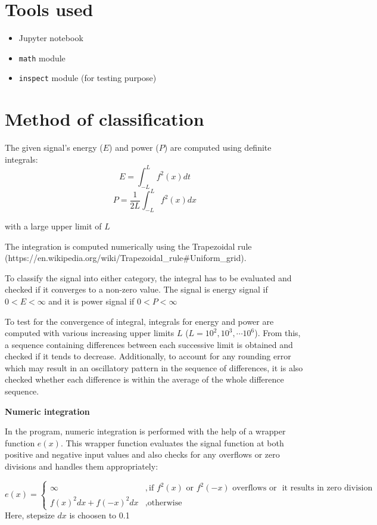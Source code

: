 \documentclass[11pt]{article}
\providecommand{\tightlist}{%
      \setlength{\itemsep}{0pt}\setlength{\parskip}{0pt}}
\begin{document}
\section*{Tools used}

\begin{itemize}
\tightlist
\item
  Jupyter notebook
\item
  \texttt{math} module
\item
  \texttt{inspect} module (for testing purpose)
\end{itemize}

\section*{Method of classification}

The given signal's energy (\(E\)) and power (\(P\)) are computed using
definite integrals: \[ E = \int_{-L} ^ L f^2(x) dt \]
\[P = \frac{1}{2L}\int_{-L} ^ L f^2(x) dx\]

with a large upper limit of \(L\)

The integration is computed numerically using the Trapezoidal rule
(https://en.wikipedia.org/wiki/Trapezoidal\_rule\#Uniform\_grid).

To classify the signal into either category, the integral has to be
evaluated and checked if it converges to a non-zero value. The signal is
energy signal if \(0 < E < \infty\) and it is power signal if
\(0 < P < \infty\)

To test for the convergence of integral, integrals for energy and power
are computed with various increasing upper limits \(L\)
(\(L = 10^2, 10^3, \cdots 10^6\)). From this, a sequence containing
differences between each successive limit is obtained and checked if it
tends to decrease. Additionally, to account for any rounding error which
may result in an oscillatory pattern in the sequence of differences, it
is also checked whether each difference is within the average of the
whole difference sequence.

{ \textbf {\Large Numeric integration }}

In the program, numeric integration is performed with the help of a
wrapper function \(e(x)\). This wrapper function evaluates the signal
function at both positive and negative input values and also checks for
any overflows or zero divisions and handles them appropriately:

\[ e(x) = 
\begin{cases}
    \infty &, \text{if } f^2(x) \text{ or } f^2(-x) \text{ overflows or } \text{ it results in zero division}\\
    f(x) ^ 2 dx + f(-x) ^ 2 dx &, \text{otherwise}
\end{cases}
\] Here, stepsize \(dx\) is choosen to 0.1
\end{document}
